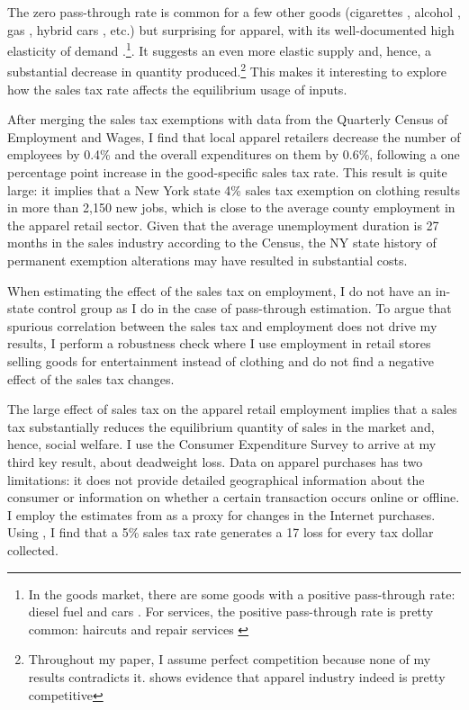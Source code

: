 \documentclass[12pt]{article}
\begin{document}
		The zero pass-through rate is common for a few other goods (cigarettes \citep{decicca, harding}, alcohol \citep{kenkel}, gas \citep{doyle}, hybrid cars \citet{sallee}, etc.) but surprising for apparel, with its well-documented high elasticity of demand \citep{einav,hu}.\footnote{In the goods market, there are some goods with a positive pass-through rate: diesel fuel \citep{marion, kopczuk} and cars \citep{carbonnier}. For services, the positive pass-through rate is pretty common: haircuts \citet{koponen} and repair services \citep{carbonnier}}. It suggests an even more elastic supply and, hence, a substantial decrease in quantity produced.\footnote{Throughout my paper, I assume perfect competition because none of my results contradicts it. \citep{csen} shows evidence that apparel industry indeed is pretty competitive} This makes it interesting to explore how the sales tax rate affects the equilibrium usage of inputs. 
		
		After merging the sales tax exemptions with data from the Quarterly Census of Employment and Wages, I find that local apparel retailers decrease the number of employees by 0.4\% and the overall expenditures on them by 0.6\%, following a one percentage point increase in the good-specific sales tax rate. 
		This result is quite large: it implies that a New York state 4\% sales tax exemption on clothing results in more than 2,150 new jobs, which is close to the average county employment in the apparel retail sector. Given that the average unemployment duration is 27 months in the sales industry according to the Census, the NY state history of permanent exemption alterations may have resulted in substantial costs. 
		
		When estimating the effect of the sales tax on employment, I do not have an in-state control group as I do in the case of pass-through estimation. To argue that spurious correlation between the sales tax and employment does not drive my results, I perform a robustness check where I use employment in retail stores selling goods for entertainment  instead of clothing and do not find a negative effect of the sales tax changes.  
		
		
		The large effect of sales tax on the apparel retail employment implies that a sales tax substantially reduces the equilibrium quantity of sales in the market and, hence, social welfare. I use the Consumer Expenditure Survey to arrive at my third key result, about deadweight loss. Data on apparel purchases has two limitations: it does not provide detailed geographical information about the consumer or information on whether a certain transaction occurs online or offline. I employ the estimates from \citet{einav} as a proxy for changes in the Internet purchases. Using \citet{goulder}, I find that a 5\% sales tax rate generates a 17\textcentoldstyle{} loss for every tax dollar collected.
		
\end{document}
